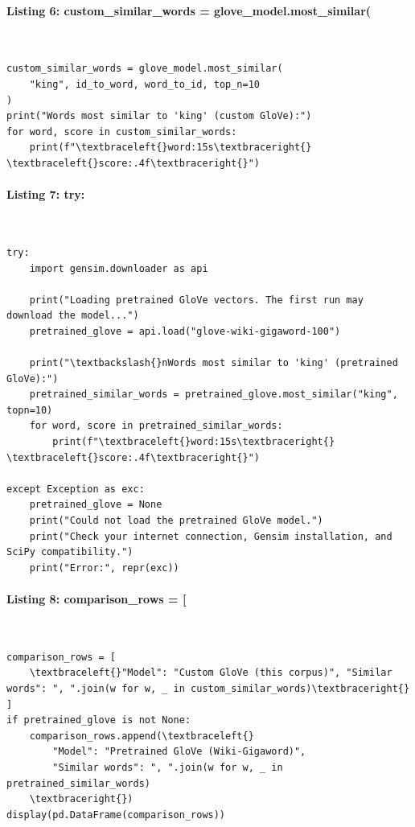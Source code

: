 \documentclass[12pt,a4paper,oneside]{report}
\begin{document}
\paragraph{Listing 6: custom\_similar\_words = glove\_model.most\_similar(}\mbox{}\\[-1ex]
\begin{Verbatim}[commandchars=\\\{\},breaklines=true,breakanywhere=true,fontsize=\scriptsize,frame=leftline,framesep=2mm,rulecolor=\color{gray}]
custom_similar_words = glove_model.most_similar(
    "king", id_to_word, word_to_id, top_n=10
)
print("Words most similar to 'king' (custom GloVe):")
for word, score in custom_similar_words:
    print(f"\textbraceleft{}word:15s\textbraceright{} \textbraceleft{}score:.4f\textbraceright{}")
\end{Verbatim}
\paragraph{Listing 7: try:}\mbox{}\\[-1ex]
\begin{Verbatim}[commandchars=\\\{\},breaklines=true,breakanywhere=true,fontsize=\scriptsize,frame=leftline,framesep=2mm,rulecolor=\color{gray}]
try:
    import gensim.downloader as api

    print("Loading pretrained GloVe vectors. The first run may download the model...")
    pretrained_glove = api.load("glove-wiki-gigaword-100")

    print("\textbackslash{}nWords most similar to 'king' (pretrained GloVe):")
    pretrained_similar_words = pretrained_glove.most_similar("king", topn=10)
    for word, score in pretrained_similar_words:
        print(f"\textbraceleft{}word:15s\textbraceright{} \textbraceleft{}score:.4f\textbraceright{}")

except Exception as exc:
    pretrained_glove = None
    print("Could not load the pretrained GloVe model.")
    print("Check your internet connection, Gensim installation, and SciPy compatibility.")
    print("Error:", repr(exc))
\end{Verbatim}
\paragraph{Listing 8: comparison\_rows = [}\mbox{}\\[-1ex]
\begin{Verbatim}[commandchars=\\\{\},breaklines=true,breakanywhere=true,fontsize=\scriptsize,frame=leftline,framesep=2mm,rulecolor=\color{gray}]
comparison_rows = [
    \textbraceleft{}"Model": "Custom GloVe (this corpus)", "Similar words": ", ".join(w for w, _ in custom_similar_words)\textbraceright{}
]
if pretrained_glove is not None:
    comparison_rows.append(\textbraceleft{}
        "Model": "Pretrained GloVe (Wiki-Gigaword)",
        "Similar words": ", ".join(w for w, _ in pretrained_similar_words)
    \textbraceright{})
display(pd.DataFrame(comparison_rows))
\end{Verbatim}
\end{document}
